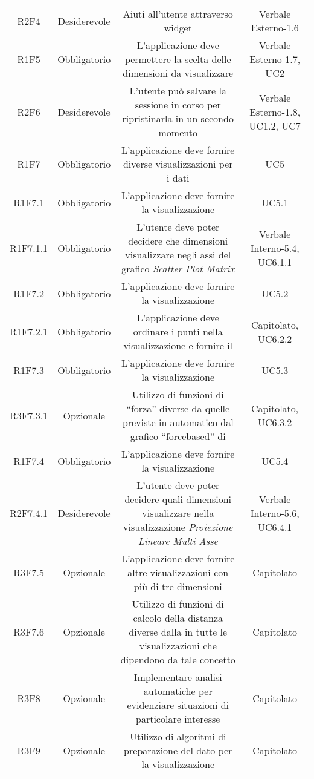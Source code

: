 \begin{center}
\begin{longtable}{C{\colA} C{\colB} C{\colC} C{\colA}}
R2F4 & Desiderevole & Aiuti all'utente attraverso widget & Verbale Esterno-1.6 \\
R1F5 & Obbligatorio & L'applicazione deve permettere la scelta delle dimensioni da visualizzare & Verbale Esterno-1.7, UC2\\
R2F6 & Desiderevole & L'utente può salvare la sessione in corso per ripristinarla in un secondo momento & Verbale Esterno-1.8, UC1.2, UC7\\
R1F7 & Obbligatorio & L'applicazione deve fornire diverse visualizzazioni per i dati & UC5\\
R1F7.1 & Obbligatorio & L'applicazione deve fornire la visualizzazione  & UC5.1\\
R1F7.1.1 & Obbligatorio & L'utente deve poter decidere che dimensioni visualizzare negli assi del grafico \textit{Scatter Plot Matrix} & Verbale Interno-5.4, UC6.1.1\\
R1F7.2 & Obbligatorio & L'applicazione deve fornire la visualizzazione  & UC5.2\\
R1F7.2.1 & Obbligatorio & L'applicazione deve ordinare i punti nella visualizzazione  e fornire il  & Capitolato, UC6.2.2 \\
R1F7.3 & Obbligatorio & L'applicazione deve fornire la visualizzazione  & UC5.3\\
R3F7.3.1 & Opzionale & Utilizzo di funzioni di “forza” diverse da quelle previste in automatico dal grafico “forcebased” di  & Capitolato, UC6.3.2\\
R1F7.4 & Obbligatorio & L'applicazione deve fornire la visualizzazione  & UC5.4 \\
R2F7.4.1 & Desiderevole & L'utente deve poter decidere quali dimensioni visualizzare nella visualizzazione \textit{Proiezione Lineare Multi Asse} & Verbale Interno-5.6, UC6.4.1\\
R3F7.5 & Opzionale & L'applicazione deve fornire altre visualizzazioni con più di tre dimensioni & Capitolato\\
R3F7.6 & Opzionale & Utilizzo di funzioni di calcolo della distanza diverse dalla  in tutte le visualizzazioni che dipendono da tale concetto & Capitolato \\
R3F8 & Opzionale & Implementare analisi automatiche per evidenziare situazioni di particolare interesse & Capitolato\\
R3F9 & Opzionale & Utilizzo di algoritmi di preparazione del dato per la visualizzazione & Capitolato\\

\end{longtable}
\end{center}
